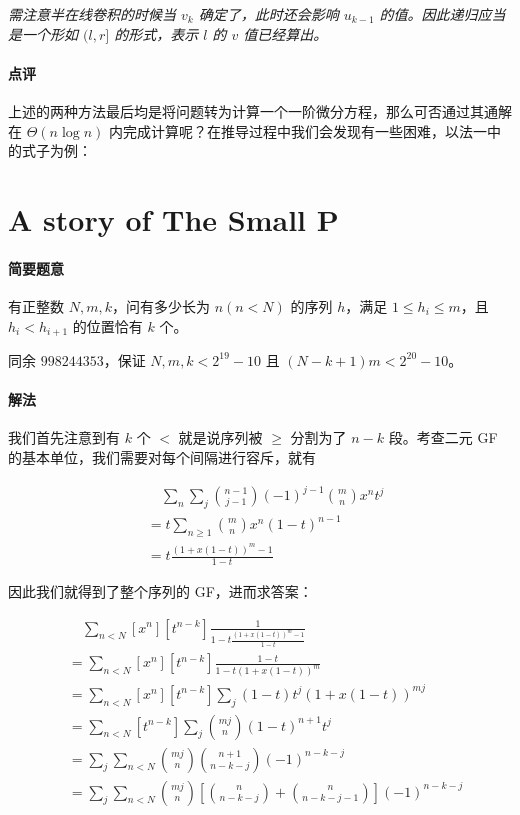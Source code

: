 \documentclass[12pt]{ctexart}
\theoremstyle{theorem}
\theoremstyle{theorem}
\begin{document}
\emph{需注意半在线卷积的时候当 $v_k$ 确定了，此时还会影响 $u_{k-1}$ 的值。因此递归应当是一个形如 $(l, r]$ 的形式，表示 $l$ 的 $v$ 值已经算出。}

\paragraph{点评}

上述的两种方法最后均是将问题转为计算一个一阶微分方程，那么可否通过其通解在 $\Theta(n\log n)$ 内完成计算呢？在推导过程中我们会发现有一些困难，以法一中的式子为例：

\newpage

\section{A story of The Small P}

\paragraph{简要题意} 有正整数 $N,m,k$，问有多少长为 $n(n<N)$ 的序列 $h$，满足 $1\le h_i\le m$，且 $h_i<h_{i+1}$ 的位置恰有 $k$ 个。

同余 $998244353$，保证 $N,m,k<2^{19}-10$ 且 $(N-k+1)m<2^{20}-10$。

\paragraph{解法} 我们首先注意到有 $k$ 个 $<$ 就是说序列被 $\ge$ 分割为了 $n-k$ 段。考查二元 GF 的基本单位，我们需要对每个间隔进行容斥，就有

\begin{align*}
&\quad \sum_n\sum_j\binom{n-1}{j-1} (-1)^{j-1} \binom m n x^nt^j\\
&= t\sum_{n\ge 1} \binom m n x^n (1-t)^{n-1}\\
&= t\frac{ (1+x(1-t))^m -1 }{1-t}
\end{align*}

因此我们就得到了整个序列的 GF，进而求答案：

\begin{align*}
&\quad \sum_{n<N}[x^n][t^{n-k}]\frac 1{1-t\frac{ (1+x(1-t))^m -1 }{1-t}}\\
&= \sum_{n<N}[x^n][t^{n-k}]\frac{1-t}{1-t(1+x(1-t))^m}\\
&= \sum_{n<N}[x^n][t^{n-k}]\sum_j (1-t)t^j(1+x(1-t))^{mj}\\
&= \sum_{n<N}[t^{n-k}]\sum_j \binom {mj}n (1-t)^{n+1}t^j\\
&= \sum_j \sum_{n<N} \binom {mj}n \binom{n+1}{n-k-j}(-1)^{n-k-j}\\
&= \sum_j \sum_{n<N} \binom {mj}n \left[ \binom n{n-k-j} + \binom n{n-k-j-1} \right](-1)^{n-k-j}
\end{align*}
\end{document}
